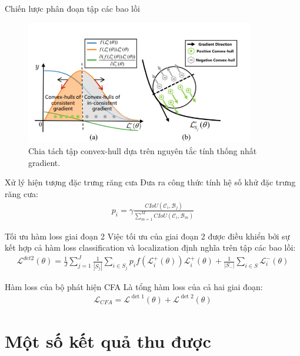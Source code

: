 \documentclass[11pt]{beamer}
\theoremstyle{definition}
\theoremstyle{plain}
\theoremstyle{plain}
\theoremstyle{remark}
\begin{document}
	
	\begin{frame}{Chiến lược phân đoạn tập các bao lồi}
		
		\begin{figure}[ht!]
			\begin{center}
				\includegraphics[width=10cm]{./Hinh_9.jpg}
				\caption{Chia tách tập convex-hull dựa trên nguyên tắc tính thống nhất gradient.}
				\label{upper_convex_function}
			\end{center}
		\end{figure}
		
	\end{frame}
	\begin{frame}{Xử lý hiện tượng đặc trưng răng cưa}
		Đưa ra công thức tính hệ số khử đặc trưng răng cưa:
		\begin{align} \label{ptdd8}
			p_i = \gamma \frac{CIoU (\mathcal{C}_i, \mathcal{B}_j)}{\sum_{m=1}^{M} CIoU (\mathcal{C}_i, \mathcal{B}_m)}
		\end{align}
	
		
		
	\end{frame}
	\begin{frame}{Tối ưu hàm loss giai đoạn 2}
		Việc tối ưu của giai đoạn 2 được điều khiển bởi sự kết hợp cả hàm loss classification và localization định nghĩa trên tập các bao lồi:\\
		\begin{align} \label{ptdd10}
			\mathcal{L}^{det2} (\theta) = \frac{1}{J} \sum_{j=1}^{J} \frac{1}{|S_j|} \sum_{i \in {S_j}} p_i f(\mathcal{L}_i^+(\theta)) \mathcal{L}_i^{+}(\theta)  + \frac{1}{|S_-|} \sum_{i \in S} \mathcal{L}_i^- (\theta) 
		\end{align}
	\end{frame}
	\begin{frame}{Hàm loss của bộ phát hiện CFA}
		Là tổng hàm loss của cả hai giai đoạn:
		\begin{align}
			\mathcal{L}_{CFA} = \mathcal{L}^{\operatorname{det} 1}(\theta)+\mathcal{L}^{\operatorname{det} 2}(\theta)
		\end{align}
		
	\end{frame}
	\section{Một số kết quả thu được}
	
	
\end{document}
